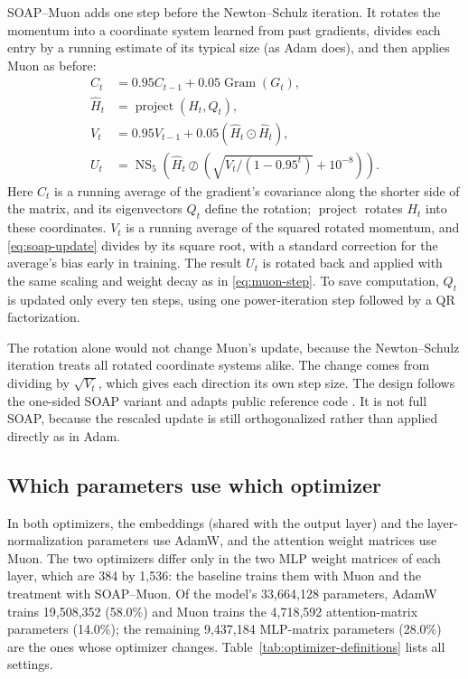 SOAP--Muon adds one step before the Newton--Schulz iteration. It rotates the
momentum into a coordinate system learned from past gradients, divides each
entry by a running estimate of its typical size (as Adam does), and then
applies Muon as before:
\begin{align}
C_t &= 0.95C_{t-1}+0.05\operatorname{Gram}(G_t), \\
\widehat H_t &= \operatorname{project}(H_t,Q_t), \\
V_t &= 0.95V_{t-1}+0.05(\widehat H_t\odot\widehat H_t), \\
U_t &= \operatorname{NS}_5\!\left(
 \widehat H_t\oslash\left(\sqrt{V_t/(1-0.95^t)}+10^{-8}\right)\right).
 \label{eq:soap-update}
\end{align}
Here $C_t$ is a running average of the gradient's covariance along the shorter
side of the matrix, and its eigenvectors $Q_t$ define the rotation;
$\operatorname{project}$ rotates $H_t$ into these coordinates. $V_t$ is a
running average of the squared rotated momentum, and \eqref{eq:soap-update}
divides by its square root, with a standard correction for the average's bias
early in training. The result $U_t$ is rotated back and applied with the same
scaling and weight decay as in \eqref{eq:muon-step}. To save computation, $Q_t$
is updated only every ten steps, using one power-iteration step followed by a
QR factorization.

The rotation alone would not change Muon's update, because the Newton--Schulz
iteration treats all rotated coordinate systems alike. The change comes from
dividing by $\sqrt{V_t}$, which gives each direction its own step size. The
design follows the one-sided SOAP variant \cite{vyas2025soap} and adapts public
reference code \cite{vyas_soapmuon_code}. It is not full SOAP, because the
rescaled update is still orthogonalized rather than applied directly as in
Adam.

\subsection{Which parameters use which optimizer}

In both optimizers, the embeddings (shared with the output layer) and the
layer-normalization parameters use AdamW, and the attention weight matrices use
Muon. The two optimizers differ only in the two MLP weight matrices of each
layer, which are 384 by 1,536: the baseline trains them with Muon and the
treatment with SOAP--Muon. Of the model's 33,664,128 parameters, AdamW trains
19,508,352 (58.0\%) and Muon trains the 4,718,592 attention-matrix parameters
(14.0\%); the remaining 9,437,184 MLP-matrix parameters (28.0\%) are the ones
whose optimizer changes. Table~\ref{tab:optimizer-definitions} lists all
settings.


